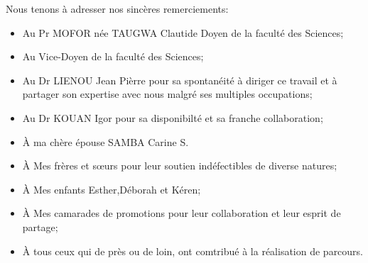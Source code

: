 Nous tenons à adresser nos sincères remerciements:
\begin{itemize}
\item Au Pr MOFOR née TAUGWA Clautide Doyen de la faculté des Sciences;
\item Au  Vice-Doyen de la faculté des Sciences;
\item Au Dr LIENOU Jean Pièrre pour sa spontanéité à diriger ce travail et à partager son expertise avec nous malgré ses multiples occupations;
\item Au Dr KOUAN Igor pour sa disponibilté  et sa franche collaboration;
\item \`{A} ma chère épouse SAMBA Carine S.
\item \`{A} Mes frères et sœurs pour leur soutien indéfectibles de diverse natures;
\item \`{A} Mes enfants Esther,Déborah et Kéren;
\item \`{A} Mes camarades de promotions pour leur collaboration et leur esprit de partage;
\item \`{A} tous ceux qui de près ou de loin, ont comtribué à la réalisation de parcours.
\end{itemize}

\myCleanStarChapterEnd
